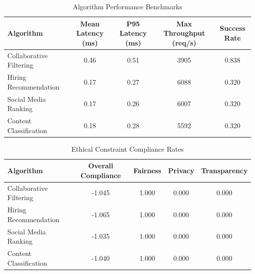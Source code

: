\begin{table}[htbp]
\centering
\caption{Algorithm Performance Benchmarks}
\label{tab:performance}
\begin{tabular}{lcccc}
\toprule
Algorithm & Mean Latency (ms) & P95 Latency (ms) & Max Throughput (req/s) & Success Rate \\
\midrule
Collaborative Filtering & 0.46 & 0.51 & 3905 & 0.838 \\
Hiring Recommendation & 0.17 & 0.27 & 6088 & 0.320 \\
Social Media Ranking & 0.17 & 0.26 & 6007 & 0.320 \\
Content Classification & 0.18 & 0.28 & 5592 & 0.320 \\
\bottomrule
\end{tabular}
\end{table}

\begin{table}[htbp]
\centering
\caption{Ethical Constraint Compliance Rates}
\label{tab:compliance}
\begin{tabular}{lcccc}
\toprule
Algorithm & Overall Compliance & Fairness & Privacy & Transparency \\
\midrule
Collaborative Filtering & -1.045 & 1.000 & 0.000 & 0.000 \\
Hiring Recommendation & -1.065 & 1.000 & 0.000 & 0.000 \\
Social Media Ranking & -1.035 & 1.000 & 0.000 & 0.000 \\
Content Classification & -1.040 & 1.000 & 0.000 & 0.000 \\
\bottomrule
\end{tabular}
\end{table}
